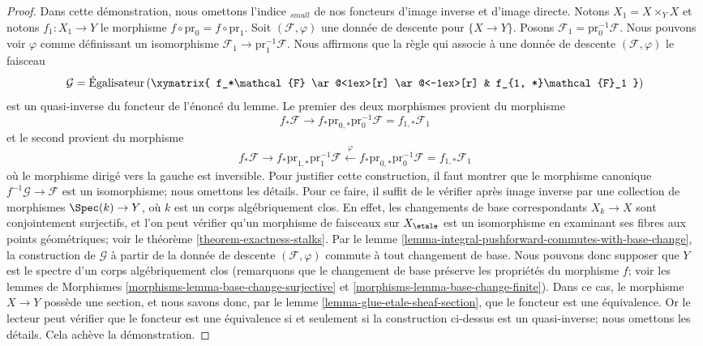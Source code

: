 \begin{proof}
Dans cette démonstration, nous omettons l'indice ${}_{small}$ de nos foncteurs
d'image inverse et d'image directe.
Notons $X_1 = X \times_Y X$ et notons $f_1 : X_1 \to Y$ le
morphisme $f \circ \text{pr}_0 = f \circ \text{pr}_1$.
Soit $(\mathcal{F}, \varphi)$ une donnée de descente pour $\{X \to Y\}$.
Posons $\mathcal{F}_1 = \text{pr}_0^{-1}\mathcal{F}$.
Nous pouvons voir $\varphi$ comme définissant un isomorphisme
$\mathcal{F}_1 \to \text{pr}_1^{-1}\mathcal{F}$.
Nous affirmons que la règle qui associe à une donnée de descente
$(\mathcal{F}, \varphi)$
le faisceau
$$
\mathcal{G} =
\text{Égalisateur}\left(
\xymatrix{
f_*\mathcal{F}
\ar@<1ex>[r] \ar@<-1ex>[r] &
f_{1, *}\mathcal{F}_1
}
\right)
$$
est un quasi-inverse du foncteur de l'énoncé du lemme.
Le premier des deux morphismes provient du morphisme
$$
f_*\mathcal{F} \to
f_*\text{pr}_{0, *}\text{pr}_0^{-1}\mathcal{F} =
f_{1, *}\mathcal{F}_1
$$
et le second provient du morphisme
$$
f_*\mathcal{F} \to
f_* \text{pr}_{1, *}\text{pr}_1^{-1}\mathcal{F}
\xleftarrow{\varphi}
f_* \text{pr}_{0, *} \text{pr}_0^{-1}\mathcal{F} =
f_{1, *}\mathcal{F}_1
$$
où le morphisme dirigé vers la gauche est inversible.
Pour justifier cette construction, il faut montrer
que le morphisme canonique $f^{-1}\mathcal{G} \to \mathcal{F}$
est un isomorphisme; nous omettons les détails. Pour ce faire, il
suffit de le vérifier après image inverse par une collection de morphismes
$\Spec(k) \to Y$, où $k$ est un corps algébriquement clos.
En effet, les changements de base correspondants $X_k \to X$ sont conjointement
surjectifs, et l'on peut vérifier qu'un morphisme de faisceaux sur $X_\etale$
est un isomorphisme en examinant ses fibres aux points géométriques; voir le
théorème \ref{theorem-exactness-stalks}.
Par le lemme \ref{lemma-integral-pushforward-commutes-with-base-change},
la construction de $\mathcal{G}$ à partir de la donnée de descente
$(\mathcal{F}, \varphi)$ commute à tout changement de base.
Nous pouvons donc supposer que $Y$ est le spectre d'un corps
algébriquement clos (remarquons que le changement de base préserve les propriétés
du morphisme $f$; voir les lemmes de Morphismes
\ref{morphisms-lemma-base-change-surjective}
et \ref{morphisms-lemma-base-change-finite}).
Dans ce cas, le morphisme $X \to Y$ possède une section, et nous
savons donc, par le lemme \ref{lemma-glue-etale-sheaf-section},
que le foncteur est une équivalence.
Or le lecteur peut vérifier que le foncteur est une équivalence
si et seulement si la construction ci-dessus est un quasi-inverse;
nous omettons les détails. Cela achève la démonstration.
\end{proof}

